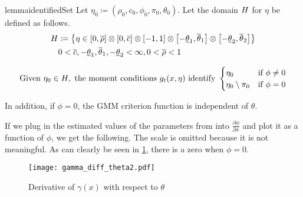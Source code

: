 \documentclass[11pt, letterpaper, twoside, final]{article}
\begin{document}
\begin{restatable}{lemma}{identifiedSet}
    \label{lemma:IdentifiedSet}
    Let $\eta_0 \coloneqq \left(\rho_0, c_0, \phi_0, \pi_0, \theta_0\right)$.
    Let the domain $H$ for $\eta$ be defined as follows. 
    \begin{equation}
    \begin{split}
        H &\coloneqq \left\{ \eta \in  [0, \overline{\rho}] \otimes [0, \overline{c}] \otimes \left[-1,
            1\right] \otimes \left[-\underline{\theta}_1, \overline{\theta}_1\right] \otimes
            \left[-\underline{\theta}_2, \overline{\theta}_2\right]\right\} \\
        &0 < \overline{c}, -\underline{\theta}_1, \overline{\theta}_1, -\underline{\theta}_2 < \infty, 0 <
            \overline{\rho} < 1
    \end{split}
    \end{equation}


    \begin{equation}
        \text{Given}\ \eta_0 \in \Eta,\ \text{the moment conditions}\ g_t(x, \eta)\ \text{identify}\
    \begin{cases}
        \eta_0                  &\text{if}\ \phi \neq 0 \\
        \eta_0 \setminus \pi_0  &\text{if}\ \phi = 0
    \end{cases}
    \label{eqn:EtaDefn}
    \end{equation}

    In addition, if $\phi = 0$, the GMM criterion function is independent of $\theta$.
\end{restatable}


If we plug in the estimated values of the parameters from \textcite{khrapov2016affine} into $\frac{\partial
\phi}{\partial \pi}$ and plot it as a function of $\phi$,  we get the following.
The scale is omitted because it is not meaningful. 
As can clearly be seen in \cref{fig:fig:gamma_diff_theta2}, there is a zero when $\phi = 0$.

\begin{figure}[htb]
    \centering
    \caption{Derivative of $\gamma(x)$ with respect to $\theta$}
    \label{fig:fig:gamma_diff_theta2}
    \texttt{[image: gamma\_diff\_theta2.pdf]}
\end{figure}
\end{document}
